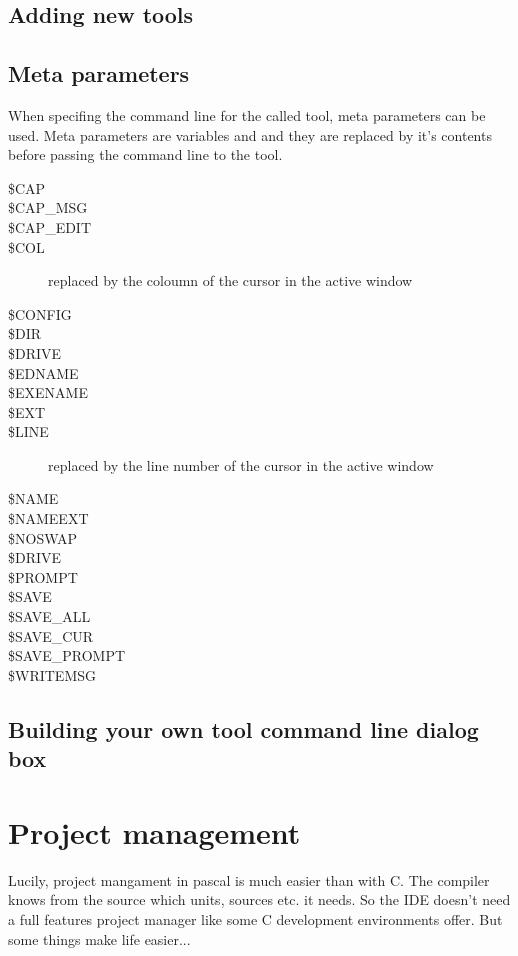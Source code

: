 \subsection{Adding new tools}

\subsection{Meta parameters}
When specifing the command line for the called tool, meta parameters can
be used. Meta parameters are variables and and they are replaced
by it's contents before passing the command line to the tool.

\begin{description}
\item[\$CAP]
\item[\$CAP\_MSG]
\item[\$CAP\_EDIT]
\item[\$COL] replaced by the coloumn of the cursor in the active window
\item[\$CONFIG]
\item[\$DIR]
\item[\$DRIVE]
\item[\$EDNAME]
\item[\$EXENAME]
\item[\$EXT]
\item[\$LINE] replaced by the line number of the cursor in the active window
\item[\$NAME]
\item[\$NAMEEXT]
\item[\$NOSWAP]
\item[\$DRIVE]
\item[\$PROMPT]
\item[\$SAVE]
\item[\$SAVE\_ALL]
\item[\$SAVE\_CUR]
\item[\$SAVE\_PROMPT]
\item[\$WRITEMSG]
\end{description}

\subsection{Building your own tool command line dialog box}

\section{Project management}
\label{ide:projectmanagement}
Lucily, project mangament in pascal is much easier than with C. The
compiler knows from the source which units, sources etc. it needs.
So the \fpc IDE doesn't need a full features project manager like
some C development environments offer. But some things make life easier...

